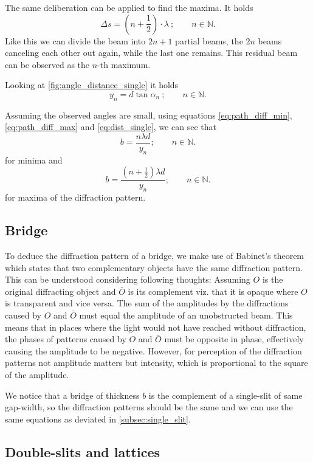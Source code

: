 The same deliberation can be applied to find the maxima.
It holds
\begin{equation}\label{eq:path_diff_max}
	\Delta s = \left(n+\frac{1}{2}\right)\cdot\lambda\ ;\qquad n\in\mathbb{N}.
\end{equation}
Like this we can divide the beam into $2n+1$ partial beams, the $2n$ beams canceling each other out again, while the last one remains.
This residual beam can be observed as the $n$-th maximum.

Looking at \autoref{fig:angle_distance_single} it holds
\begin{equation}\label{eq:dist_single}
	y_n = d\tan\alpha_n\ ;\qquad n\in\mathbb{N}.
\end{equation}

Assuming the observed angles are small, using equations \ref{eq:path_diff_min}, \ref{eq:path_diff_max} and \ref{eq:dist_single}, we can see that
\begin{equation}\label{eq:single_slit_minima}
	b = \frac{n\lambda d}{y_n} ;\qquad n\in\mathbb{N}.
\end{equation}
for minima and
\begin{equation}\label{eq:single_slit_maxima}
	b = \frac{\left(n+\frac{1}{2}\right)\lambda d}{y_n} ;\qquad n\in\mathbb{N}.
\end{equation}
for maxima of the diffraction pattern.

\subsection{Bridge}
To deduce the diffraction pattern of a bridge, we make use of Babinet's theorem which states that two complementary objects have the same diffraction pattern.
This can be understood considering following thoughts:
Assuming $O$ is the original diffracting object and $\bar{O}$ is its complement viz. that it is opaque where $O$ is transparent and vice versa.
The sum of the amplitudes by the diffractions caused by $O$ and $\bar{O}$ must equal the amplitude of an unobstructed beam.
This means that in places where the light would not have reached without diffraction, the phases of patterns caused by $O$ and $\bar{O}$ must be opposite in phase, effectively causing the amplitude to be negative.
However, for perception of the diffraction patterns not amplitude matters but intensity, which is proportional to the square of the amplitude.

We notice that a bridge of thickness $b$ is the complement of a single-slit of same gap-width, so the diffraction patterns should be the same and we can use the same equations as deviated in \autoref{subsec:single_slit}.

\subsection{Double-slits and lattices}
